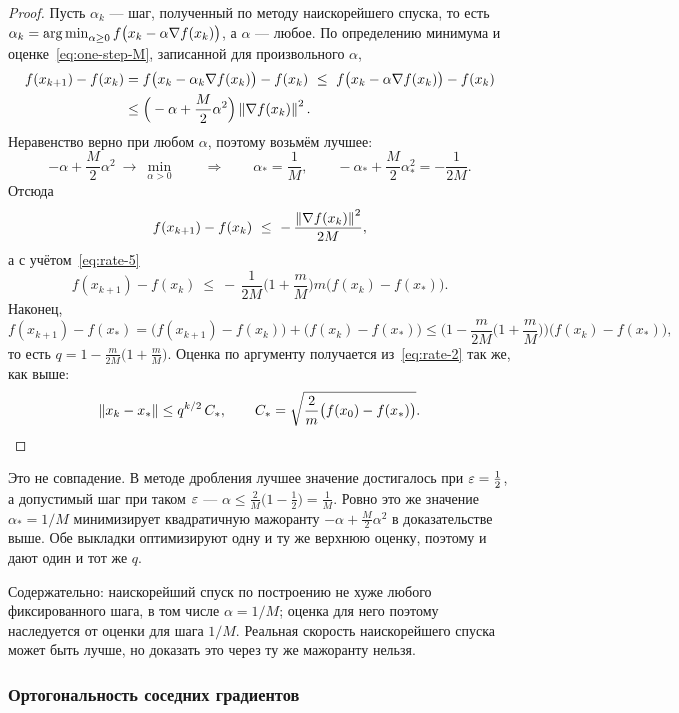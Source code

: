 \begin{proof}
Пусть $\alpha_k$ — шаг, полученный по методу наискорейшего спуска, то есть
$\alpha_k = \operatorname*{arg\,min}_{\alpha \ge 0} f\big(x_k - \alpha \nabla f(x_k)\big)$,
а $\alpha$ — любое. По определению минимума и оценке~\eqref{eq:one-step-M},
записанной для произвольного $\alpha$,
\begin{align*}
  f(x_{k+1}) - f(x_k)
  &= f\big(x_k - \alpha_k \nabla f(x_k)\big) - f(x_k)
   \ \le\ f\big(x_k - \alpha \nabla f(x_k)\big) - f(x_k) \\
  &\le \Big(-\alpha + \frac{M}{2}\alpha^2\Big) \left\lVert \nabla f(x_k) \right\rVert^2 .
\end{align*}
Неравенство верно при любом $\alpha$, поэтому возьмём лучшее:
\[
  -\alpha + \frac{M}{2}\alpha^2 \ \to\ \min_{\alpha > 0}
  \qquad\Longrightarrow\qquad
  \alpha_* = \frac{1}{M} , \qquad
  -\alpha_* + \frac{M}{2}\alpha_*^2 = -\frac{1}{2M} .
\]
Отсюда
\[
  f(x_{k+1}) - f(x_k) \ \le\ -\,\frac{\norm{\nabla f(x_k)}^2}{2M} ,
\]
а с учётом~\eqref{eq:rate-5}
\[
  f(x_{k+1}) - f(x_k)
  \ \le\ -\,\frac{1}{2M}\Big(1 + \frac{m}{M}\Big) m \big(f(x_k) - f(x_*)\big) .
\]
Наконец,
\[
  f(x_{k+1}) - f(x_*) = \big(f(x_{k+1}) - f(x_k)\big) + \big(f(x_k) - f(x_*)\big)
  \le \Big(1 - \frac{m}{2M}\Big(1 + \frac{m}{M}\Big)\Big)
      \big(f(x_k) - f(x_*)\big) ,
\]
то есть $q = 1 - \frac{m}{2M}\big(1 + \frac{m}{M}\big)$. Оценка по аргументу
получается из~\eqref{eq:rate-2} так же, как выше:
\[
  \left\lVert x_k - x_* \right\rVert \le q^{k/2}\, C_* ,
  \qquad
  C_* = \sqrt{\frac{2}{m}\big(f(x_0) - f(x_*)\big)} .
  \qedhere
\]
\end{proof}

\begin{idea}[title={Почему $q$ совпало с $q_{\min}$ дробления}]
Это не совпадение. В методе дробления лучшее значение достигалось при
$\varepsilon = \tfrac12$, а допустимый шаг при таком $\varepsilon$ —
$\alpha \le \frac{2}{M}\big(1 - \tfrac12\big) = \frac{1}{M}$. Ровно это же
значение $\alpha_* = 1/M$ минимизирует квадратичную мажоранту
$-\alpha + \frac{M}{2}\alpha^2$ в доказательстве выше. Обе выкладки
оптимизируют одну и ту же верхнюю оценку, поэтому и дают один и тот же $q$.

Содержательно: наискорейший спуск по построению не хуже любого фиксированного
шага, в том числе $\alpha = 1/M$; оценка для него поэтому наследуется от оценки
для шага $1/M$. Реальная скорость наискорейшего спуска может быть лучше, но
доказать это через ту же мажоранту нельзя.
\end{idea}

\subsubsection*{Ортогональность соседних градиентов}

